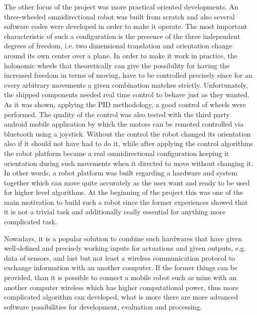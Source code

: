 \documentclass[12pt,english,twoside]{article}
\begin{document}
The other focus of the project was more practical oriented developments. An three-wheeled omnidirectional robot was built from scratch and also several software codes were developed in order to make it operate. The most important characteristic of such a configuration is the presence of the three independent degrees of freedom, i.e. two dimensional translation and orientation change around its own center over a plane. In order to make it work in practice, the holonomic wheels that theoretically can give the possibility for having the increased freedom in terms of moving, have to be controlled precisely since for an every arbitrary movements a given combination matches strictly. Unfortunately, the shipped components needed real time control to behave just as they wanted. As it was shown, applying the PID methodology, a good control of wheels were performed. The quality of the control was also tested with the third party android mobile application by which the motors can be remoted controlled via bluetooth using a joystick. Without the control the robot changed its orientation also if it should not have had to do it, while after applying the control algorithms the robot platform became a real omnidirectional configuration keeping it orientation during such movements when it directed to move without changing it. In other words, a robot platform was built regarding a hardware and system together which can move quite accurately as the user want and ready to be used for higher level algorithms. At the beginning of the project this was one of the main motivation to build such a robot since the former experiences showed that it is not a trivial task and additionally really essential for anything more complicated task.

Nowadays, it is a popular solution to combine such hardwares that have given well-defined and precisely working inputs for actuations and given outputs, e.g. data of sensors, and last but not least a wireless communication protocol to exchange information with an another computer. If the former things can be provided, than it is possible to connect a mobile robot such as mine with an another computer wireless which has higher computational power, thus more complicated algorithm can developed, what is more there are more advanced software possibilities for development, evaluation and processing. 
\end{document}
